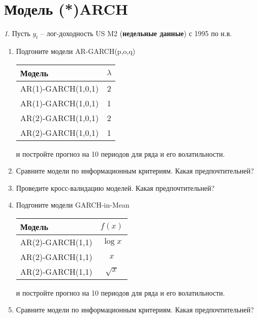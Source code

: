 \documentclass[12pt]{article}
\theoremstyle{remark}
\newtheorem{exercise}{}[subsection]
\begin{document}
\section{Модель (*)ARCH}

\begin{exercise}
Пусть \(y_t\) -- лог-доходность US M2 (\textbf{недельные данные}) с 1995 по н.в.
\begin{enumerate}
	\item Подгоните модели AR-GARCH(p,o,q)
	\begin{center}
	\begin{tabular}{l|c}
		Модель & \(\lambda\) \\ \hline
		AR(1)-GARCH(1,0,1) & 2 \\
		AR(1)-GARCH(1,0,1) & 1 \\
		AR(2)-GARCH(1,0,1) & 2 \\
		AR(2)-GARCH(1,0,1) & 1 \\ \hline
	\end{tabular}
	\end{center} 
	и постройте прогноз на 10 периодов для ряда и его волатильности.
	\item Сравните модели по информационным критериям. Какая предпочтительней?
	\item Проведите кросс-валидацию моделей. Какая предпочтительней?
	\item Подгоните модели GARCH-in-Mean
	\begin{center}
		\begin{tabular}{l|c}
			Модель & \(f(x)\) \\ \hline
			AR(2)-GARCH(1,1) & \(\log x\) \\
			AR(2)-GARCH(1,1) & \(x\) \\
			AR(2)-GARCH(1,1) & \(\sqrt{x}\) \\
		\end{tabular}
	\end{center} 
	и постройте прогноз на 10 периодов для ряда и его волатильности.
	\item Сравните модели по информационным критериям. Какая предпочтительней?
\end{enumerate}
\end{exercise}
\end{document}
